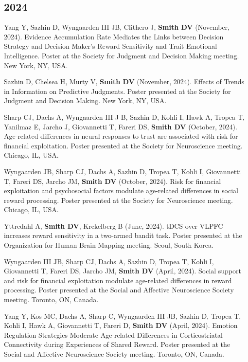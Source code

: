 \documentclass[11pt, letterpaper]{article}
\begin{document}
\subsection*{2024}
\begin{hangparas}{.5in}{1}

Yang Y, Sazhin D, Wyngaarden III JB, Clithero J, \textbf{Smith DV} (November, 2024). Evidence Accumulation Rate Mediates the Links between Decision Strategy and Decision Maker’s Reward Sensitivity and Trait Emotional Intelligence. Poster at the Society for Judgment and Decision Making meeting. New York, NY, USA.

Sazhin D, Chelsea H, Murty V, \textbf{Smith DV} (November, 2024). Effects of Trends in Information on Predictive Judgments. Poster presented at the Society for Judgment and Decision Making. New York, NY, USA.

Sharp CJ, Dachs A, Wyngaarden III J B, Sazhin D, Kohli I, Hawk A, Tropea T, Yanilmaz E, Jarcho J, Giovannetti T, Fareri DS, \textbf{Smith DV} (October, 2024). Age-related differences in neural responses to trust are associated with risk for financial exploitation. Poster presented at the Society for Neuroscience meeting. Chicago, IL, USA.

Wyngaarden JB, Sharp CJ, Dachs A, Sazhin D, Tropea T, Kohli I, Giovannetti T, Fareri DS, Jarcho JM, \textbf{Smith DV} (October, 2024). Risk for financial exploitation and psychosocial factors modulate age-related differences in social reward processing. Poster presented at the Society for Neuroscience meeting. Chicago, IL, USA.

Yttredahl A, \textbf{Smith DV}, Krekelberg B (June, 2024). tDCS over VLPFC increases reward sensitivity in a two-armed bandit task. Poster presented at the Organization for Human Brain Mapping meeting. Seoul, South Korea.

Wyngaarden III JB, Sharp CJ, Dachs A, Sazhin D, Tropea T, Kohli I, Giovannetti T, Fareri DS, Jarcho JM, \textbf{Smith DV} (April, 2024). Social support and risk for financial exploitation modulate age-related differences in reward processing. Poster presented at the Social and Affective Neuroscience Society meeting. Toronto, ON, Canada.

Yang Y, Kos MC, Dachs A, Sharp C, Wyngaarden III JB, Sazhin D, Tropea T, Kohli I, Hawk A, Giovannetti T, Fareri D, \textbf{Smith DV} (April, 2024). Emotion Regulation Strategies Moderate Age-related Differences in Corticostriatal Connectivity during Experiences of Shared Reward. Poster presented at the Social and Affective Neuroscience Society meeting. Toronto, ON, Canada.


\end{hangparas}
\end{document}
